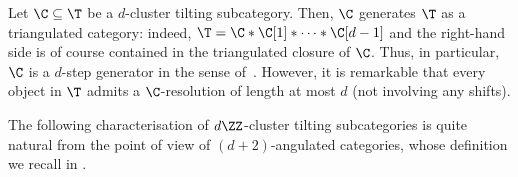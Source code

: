 \documentclass[a4paper]{amsart}
\begin{document}

\begin{remark}
  Let $\C\subseteq\T$ be a $d$-cluster tilting subcategory. Then, $\C$ generates
  $\T$ as a triangulated category: indeed, $\T=\C*\C[1]*\cdots*\C[d-1]$ and the
  right-hand side is of course contained in the triangulated closure of $\C$.
  Thus, in particular, $\C$ is a $d$-step generator in the sense
  of~\cite{Rou08}. However, it is remarkable that every object in $\T$ admits a
  $\C$-resolution of length at most $d$ (not involving any shifts).
\end{remark}

The following characterisation of $d\ZZ$-cluster tilting subcategories is quite
natural from the point of view of $(d+2)$-angulated categories, whose definition
we recall in .
\end{document}
